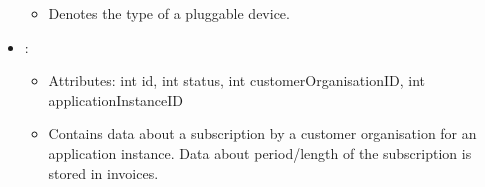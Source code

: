\begin{itemize}[nolistsep,noitemsep]
\begin{itemize}[noitemsep,nolistsep]
\item[] Denotes the type of a pluggable device.
\end{itemize}
\item {}: 
\begin{itemize}[noitemsep,nolistsep]
\item[] Attributes: int id, int status, int customerOrganisationID, int applicationInstanceID
\item[] Contains data about a subscription by a customer organisation for an application instance. Data about period/length of the subscription is stored in invoices.
\end{itemize}
\end{itemize}

%
